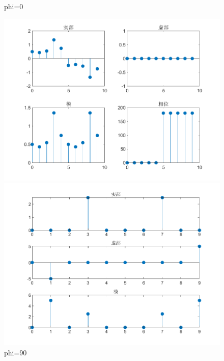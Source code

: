 \documentclass{../source/zjureport}
\begin{document}
\begin{figure}[htbp]
\begin{minipage}[t]{0.48\textwidth}
                    \end{minipage}
                    \caption{phi=0}
                \end{figure}

                \newpage

                \begin{figure}[htbp]
                    \centering
                    \begin{minipage}[t]{0.48\textwidth}
                    \centering
                    \includegraphics[width=\textwidth]{figure/复合函数序列_phi=90.png}
                    \end{minipage}
                    \begin{minipage}[t]{0.48\textwidth}
                    \centering
                    \includegraphics[width=\textwidth]{figure/频谱_复合函数序列_phi=90.png}
                    \end{minipage}
                    \caption{phi=90}
                \end{figure}
\end{document}
